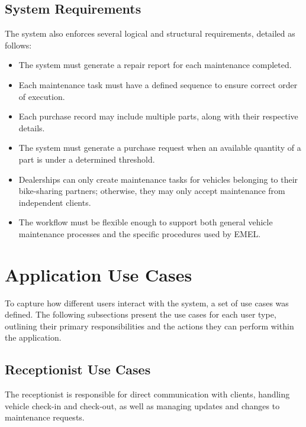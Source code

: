 \subsection{System Requirements}
The system also enforces several logical and structural requirements, detailed as follows:

\begin{itemize}
    \item The system must generate a repair report for each maintenance completed.
    \item Each maintenance task must have a defined sequence to ensure correct order of execution.
    \item Each purchase record may include multiple parts, along with their respective details.
    \item The system must generate a purchase request when an available quantity of a part is under a determined threshold. 
    \item Dealerships can only create maintenance tasks for vehicles belonging to their bike-sharing partners; otherwise, they may only accept maintenance from independent clients.
    \item The workflow must be flexible enough to support both general vehicle maintenance processes and the specific procedures used by EMEL.
\end{itemize}

\section{Application Use Cases}
To capture how different users interact with the system, a set of use cases was defined. The following subsections present the use cases for each user type, outlining their primary responsibilities and the actions they can perform within the application.

\subsection{Receptionist Use Cases}
The receptionist is responsible for direct communication with clients, handling vehicle check-in and check-out, as well as managing updates and changes to maintenance requests.

